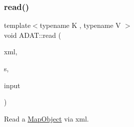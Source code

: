 \subsubsection{\texorpdfstring{read()}{read()}}
{\footnotesize\ttfamily template$<$typename K , typename V $>$ \\
void A\+D\+A\+T\+::read (\begin{DoxyParamCaption}\item[{\mbox{\hyperlink{classADATXML_1_1XMLReader}{A\+D\+A\+T\+X\+M\+L\+::\+X\+M\+L\+Reader}} \&}]{xml,  }\item[{const std\+::string \&}]{s,  }\item[{\mbox{\hyperlink{classADAT_1_1MapObject}{Map\+Object}}$<$ K, V $>$ \&}]{input }\end{DoxyParamCaption})\hspace{0.3cm}{\ttfamily [inline]}}



Read a \mbox{\hyperlink{classADAT_1_1MapObject}{Map\+Object}} via xml. 

